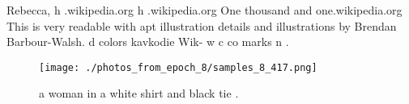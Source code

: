 \documentclass{article}%
\begin{document}
Rebecca, h\newline%
.wikipedia.org\newline%
h\newline%
.wikipedia.org\newline%
One thousand and one.wikipedia.org\newline%
This is very readable with apt illustration details and illustrations by Brendan Barbour{-}Walsh.\newline%
d\newline%
colors\newline%
kavkodie\newline%
Wik{-}\newline%
w\newline%
c\newline%
co\newline%
marks\newline%
n\newline%
.\newline%

%


\begin{figure}[h!]%
\centering%
\texttt{[image: ./photos\_from\_epoch\_8/samples\_8\_417.png]}%
\caption{a woman in a white shirt and black tie .}%
\end{figure}

%
\end{document}
